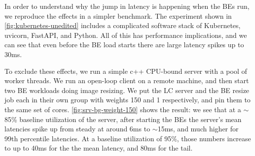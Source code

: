 In order to understand why the jump in latency is happening when the BEs run, we
reproduce the effects in a simpler benchmark. The experiment shown in
\autoref{fig:kubernetes-unedited} includes a complicated software stack of
Kubernetes, uvicorn, FastAPI, and Python. All of this has performance
implications, and we can see that even before the BE load starts there are large
latency spikes up to 30ms.

To exclude these effects, we run a simple c++ CPU-bound server with a pool of
worker threads. We run an open-loop client on a remote machine, and then start
two BE workloads doing image resizing. We put the LC server and the BE resize
job each in their own \cgroups{} group with weights 150 and 1 respectively, and
pin them to the same set of cores. \autoref{fig:srv-bg-weight-150} shows the
result: we see that at a $\sim$85\% baseline utilization of the server, after
starting the BEs the server's mean latencies spike up from steady at around 6ms
to $\sim$15ms, and much higher for 99th percentile latencies. At a baseline
utilization of 95\%, those numbers increase to up to 40ms for the the mean
latency, and 80ms for the tail.

